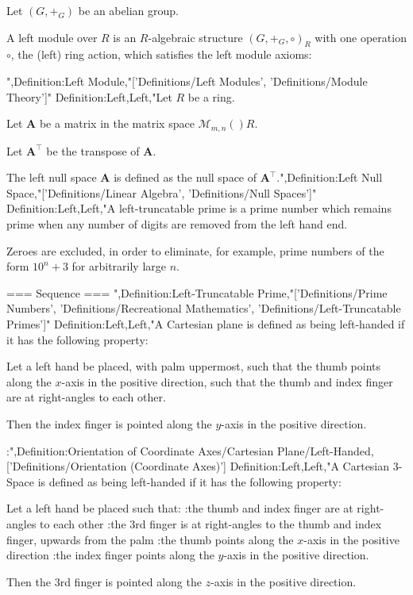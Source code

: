 Let $\left( G, +_G \right)$ be an abelian group.


A left module over $R$ is an $R$-algebraic structure $\left( G, +_G, \circ \right)_R$ with one operation $\circ$, the (left) ring action, which satisfies the left module axioms:

",Definition:Left Module,"['Definitions/Left Modules', 'Definitions/Module Theory']"
Definition:Left,Left,"Let $R$ be a ring.

Let $\mathbf A$ be a matrix in the matrix space $\mathcal M_{m, n}  \left(   \right)R$.

Let $\mathbf A^\intercal$ be the transpose of $\mathbf A$.

The left null space $\mathbf A$ is defined as the null space of $\mathbf A^\intercal$.",Definition:Left Null Space,"['Definitions/Linear Algebra', 'Definitions/Null Spaces']"
Definition:Left,Left,"A left-truncatable prime is a prime number which remains prime when any number of digits are removed from the left hand end.

Zeroes are excluded, in order to eliminate, for example, prime numbers of the form $10^n + 3$ for arbitrarily large $n$.


=== Sequence ===
",Definition:Left-Truncatable Prime,"['Definitions/Prime Numbers', 'Definitions/Recreational Mathematics', 'Definitions/Left-Truncatable Primes']"
Definition:Left,Left,"A Cartesian plane is defined as being left-handed if it has the following property:

Let a left hand be placed, with palm uppermost, such that the thumb points along the $x$-axis in the positive direction, such that the thumb and index finger are at right-angles to each other.

Then the index finger is pointed along the $y$-axis in the positive direction.


:",Definition:Orientation of Coordinate Axes/Cartesian Plane/Left-Handed,['Definitions/Orientation (Coordinate Axes)']
Definition:Left,Left,"A Cartesian $3$-Space is defined as being left-handed if it has the following property:

Let a left hand be placed such that:
:the thumb and index finger are at right-angles to each other
:the $3$rd finger is at right-angles to the thumb and index finger, upwards from the palm
:the thumb points along the $x$-axis in the positive direction
:the index finger points along the $y$-axis in the positive direction.

Then the $3$rd finger is pointed along the $z$-axis in the positive direction.


